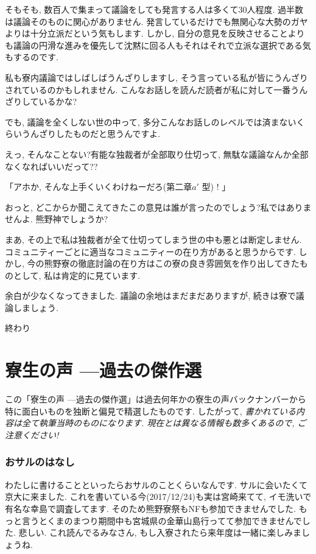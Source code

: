 \documentclass[10pt,b5jsbook,dvips,dvipdfmx,openany]{jsbook}
\theoremstyle{definition}
\begin{document}
		そもそも, 数百人で集まって議論をしても発言する人は多くて30人程度. 過半数は議論そのものに関心がありません. 発言しているだけでも無関心な大勢のガヤよりは十分立派だという気もします. しかし, 自分の意見を反映させることよりも議論の円滑な進みを優先して沈黙に回る人もそれはそれで立派な選択である気もするのです.

		私も寮内議論ではしばしばうんざりしますし, そう言っている私が皆にうんざりされているのかもしれません. こんなお話しを読んだ読者が私に対して一番うんざりしているかな?

		でも, 議論を全くしない世の中って, 多分こんなお話しのレベルでは済まないくらいうんざりしたものだと思うんですよ.

		えっ, そんなことない?有能な独裁者が全部取り仕切って, 無駄な議論なんか全部なくなればいいだって??

		「アホか, そんな上手くいくわけねーだろ(第二章$a'$ 型) ! 」

		おっと, どこからか聞こえてきたこの意見は誰が言ったのでしょう?私ではありませんよ. 熊野神でしょうか?

		まあ, その上で私は独裁者が全て仕切ってしまう世の中も悪とは断定しません. コミュニティーごとに適当なコミュニティーの在り方があると思うからです. しかし, 今の熊野寮の徹底討論の在り方はこの寮の良き雰囲気を作り出してきたものとして, 私は肯定的に見ています.

		余白が少なくなってきました. 議論の余地はまだまだありますが, 続きは寮で議論しましょう.

		終わり




\chapter{寮生の声 ---過去の傑作選}

\setcounter{footnote}{0}

この「寮生の声 ---過去の傑作選」は過去何年かの寮生の声バックナンバーから特に面白いものを独断と偏見で精選したものです. したがって, \emph{書かれている内容は全て執筆当時のものになります. 現在とは異なる情報も数多くあるので, ご注意ください!}

		\subsection{おサルのはなし}
		わたしに書けることといったらおサルのことくらいなんです. サルに会いたくて京大に来ました. これを書いている今(2017/12/24)も実は宮崎来てて, イモ洗いで有名な幸島で調査してます. そのため熊野寮祭もNFも参加できませんでした. もっと言うとくまのまつり期間中も宮城県の金華山島行ってて参加できませんでした. 悲しい. これ読んでるみなさん, もし入寮されたら来年度は一緒に楽しみましょうね.
\end{document}
